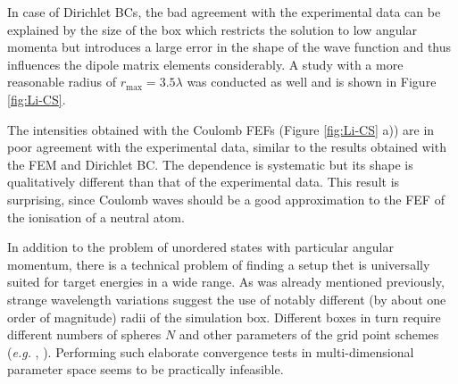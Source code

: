 In case of Dirichlet BCs, the bad agreement with the experimental data can be explained by the size of the box which restricts the solution to low angular momenta but introduces a large error in the shape of the wave function and thus influences the dipole matrix elements considerably.
A study with a more reasonable radius of $r_\text{max}=3.5\lambda$ was conducted as well and is shown in Figure \ref{fig:Li-CS}.

The intensities obtained with the Coulomb FEFs (Figure \ref{fig:Li-CS} a)) are in poor agreement with the experimental data, similar to the results obtained with the FEM and Dirichlet BC.
The dependence is systematic but its shape is qualitatively different than that of the experimental data.
This result is surprising, since Coulomb waves should be a good approximation to the FEF of the ionisation of a neutral atom.

In addition to the problem of unordered states with particular angular momentum, there is a technical problem of finding a setup thet is universally suited for target energies in a wide range.
As was already mentioned previously, strange wavelength variations suggest the use of notably different (by about one order of magnitude) radii of the simulation box.
Different boxes in turn require different numbers of spheres $N$ and other parameters of the grid point schemes (\textit{e.g.} , ).
Performing such elaborate convergence tests in multi-dimensional parameter space seems to be practically infeasible.

